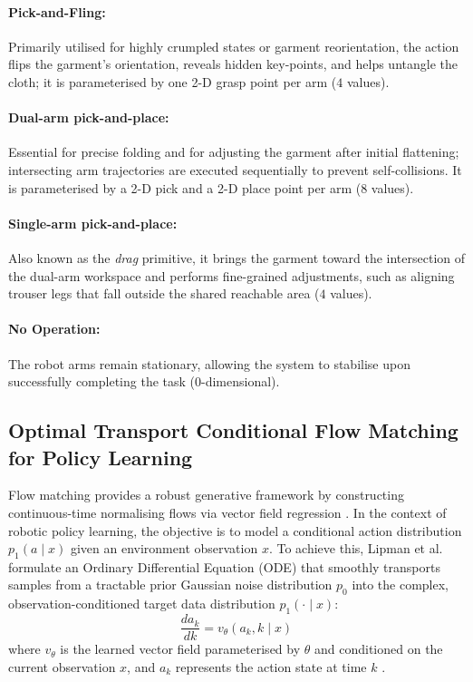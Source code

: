 \documentclass[journal]{IEEEtran}
\begin{document}
\paragraph{Pick-and-Fling:} Primarily utilised for highly crumpled states or garment reorientation, the action flips the garment's orientation, reveals hidden key-points, and helps untangle the cloth; it is parameterised by one 2-D grasp point per arm ($4$ values).

\paragraph{Dual-arm pick-and-place:} Essential for precise folding and for adjusting the garment after initial flattening; intersecting arm trajectories are executed sequentially to prevent self-collisions. It is parameterised by a 2-D pick and a 2-D place point per arm ($8$ values).

\paragraph{Single-arm pick-and-place:} Also known as the \textit{drag} primitive, it brings the garment toward the intersection of the dual-arm workspace and performs fine-grained adjustments, such as aligning trouser legs that fall outside the shared reachable area ($4$ values).

\paragraph{No Operation:} The robot arms remain stationary, allowing the system to stabilise upon successfully completing the task ($0$-dimensional).

\subsection{Optimal Transport Conditional Flow Matching for Policy Learning} \label{sec:ot_cfm}

Flow matching provides a robust generative framework by constructing continuous-time normalising flows via vector field regression \cite{lipman2022flow}. In the context of robotic policy learning, the objective is to model a conditional action distribution $p_1(a \mid x)$ given an environment observation $x$. To achieve this, Lipman et al. \cite{lipman2022flow} formulate an Ordinary Differential Equation (ODE) that smoothly transports samples from a tractable prior Gaussian noise distribution $p_0$ into the complex, observation-conditioned target data distribution $p_1(\cdot \mid x)$:
\begin{equation}
    \frac{da_k}{dk} = v_\theta(a_k, k \mid x)
\end{equation}
where $v_\theta$ is the learned vector field parameterised by $\theta$ and conditioned on the current observation $x$, and $a_k$ represents the action state at time $k$ \cite{lipman2022flow}. 
\end{document}
